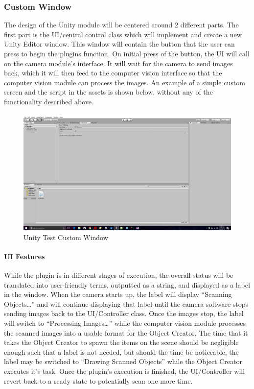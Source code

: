 \documentclass[12pt]{article}
\begin{document}
\subsubsection{Custom Window}\label{custom-window}

The design of the Unity module will be centered around 2 different
parts. The first part is the UI/central control class which will
implement and create a new Unity Editor window. This window will contain
the button that the user can press to begin the plugins function. On
initial press of the button, the UI will call on the camera module's
interface. It will wait for the camera to send images back, which it
will then feed to the computer vision interface so that the computer
vision module can process the images. An example of a simple custom
screen and the script in the assets is shown below, without any of the
functionality described above.

\begin{figure}
\centering
\includegraphics{Pictures/editorwindow.png}
\caption{Unity Test Custom Window}
\end{figure}

\paragraph{UI Features}\label{ui-features}

While the plugin is in different stages of execution, the overall status
will be translated into user-friendly terms, outputted as a string, and
displayed as a label in the window. When the camera starts up, the label
will display ``Scanning Objects\ldots{}'' and will continue displaying
that label until the camera software stops sending images back to the
UI/Controller class. Once the images stop, the label will switch to
``Processing Images\ldots{}'' while the computer vision module processes
the scanned images into a usable format for the Object Creator. The time
that it takes the Object Creator to spawn the items on the scene should
be negligible enough such that a label is not needed, but should the
time be noticeable, the label may be switched to ``Drawing Scanned
Objects'' while the Object Creator executes it's task. Once the plugin's
execution is finished, the UI/Controller will revert back to a ready
state to potentially scan one more time.
\end{document}
